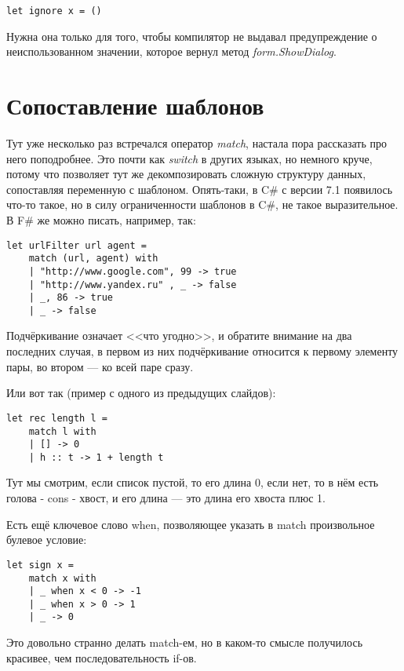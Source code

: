 \documentclass{../../text-style}
\begin{document}
\begin{verbatim}
let ignore x = ()
\end{verbatim}

Нужна она только для того, чтобы компилятор не выдавал предупреждение о неиспользованном значении, которое вернул метод \textit{form.ShowDialog}.

\section{Сопоставление шаблонов}

Тут уже несколько раз встречался оператор \textit{match}, настала пора рассказать про него поподробнее. Это почти как \textit{switch} в других языках, но немного круче, потому что позволяет тут же декомпозировать сложную структуру данных, сопоставляя переменную с шаблоном. Опять-таки, в C\# с версии 7.1 появилось что-то такое, но в силу ограниченности шаблонов в C\#, не такое выразительное. В F\# же можно писать, например, так:

\begin{verbatim}
let urlFilter url agent =
    match (url, agent) with
    | "http://www.google.com", 99 -> true
    | "http://www.yandex.ru" , _ -> false
    | _, 86 -> true
    | _ -> false
\end{verbatim}

Подчёркивание означает <<что угодно>>, и обратите внимание на два последних случая, в первом из них подчёркивание относится к первому элементу пары, во втором --- ко всей паре сразу.

Или вот так (пример с одного из предыдущих слайдов):

\begin{verbatim}
let rec length l =
    match l with
    | [] -> 0
    | h :: t -> 1 + length t
\end{verbatim}

Тут мы смотрим, если список пустой, то его длина 0, если нет, то в нём есть голова - cons - хвост, и его длина --- это длина его хвоста плюс 1.

Есть ещё ключевое слово when, позволяющее указать в match произвольное булевое условие:

\begin{verbatim}
let sign x =
    match x with
    | _ when x < 0 -> -1
    | _ when x > 0 -> 1
    | _ -> 0
\end{verbatim}

Это довольно странно делать match-ем, но в каком-то смысле получилось красивее, чем последовательность if-ов.
\end{document}
